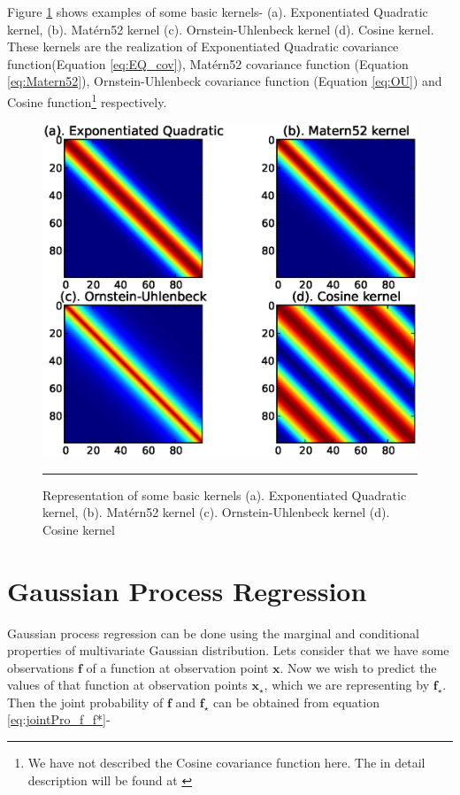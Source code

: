 Figure \ref{fig:DifferentKernels} shows examples of some basic kernels- (a). Exponentiated Quadratic kernel, 
(b). Mat{\'e}rn52 kernel (c). Ornstein-Uhlenbeck kernel (d). Cosine kernel. These kernels are the 
realization of Exponentiated Quadratic covariance function(Equation \ref{eq:EQ_cov}), 
Mat{\'e}rn52 covariance function 
(Equation \ref{eq:Matern52}), Ornstein-Uhlenbeck covariance function (Equation \ref{eq:OU}) 
and Cosine function\footnote{We have not described the Cosine covariance function here. 
The in detail description will be found at \cite{Rasmussen_and_Williams:2006}} respectively.

\begin{figure}[t]
	\centering
		\includegraphics[width=\textwidth,keepaspectratio]{diagrams/DifferentKernels.eps}
		\rule{35em}{0.5pt}
	\caption[Representation of some basic kernels ]
		{Representation of some basic kernels (a). Exponentiated Quadratic kernel, 
		(b). Mat{\'e}rn52 kernel (c). Ornstein-Uhlenbeck kernel (d). Cosine kernel  }
	\label{fig:DifferentKernels}
\end{figure}

\section{Gaussian Process Regression}
Gaussian process regression can be done using the marginal and conditional properties of multivariate
Gaussian distribution. Lets consider that we have some observations $\mathbf{f}$ of a function at observation
point $\mathbf{x}$. Now we wish to predict the values of that function at observation points $\mathbf{x_\star}$,
which we are representing by $\mathbf{f_\star}$. Then the joint probability of $\mathbf{f}$ and $\mathbf{f_\star}$
can be obtained from equation \ref{eq:jointPro_f_f*}-

